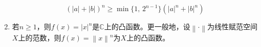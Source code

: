 \documentclass[color=green,thmcnt=section,lang=cn,12pt]{elegantbook}
\numberwithin{equation}{section}%
\numberwithin{figure}{section}%
\newcommand{\CC}{\mathbb{C}}
\begin{document}
\begin{corollary}
\begin{enumerate}
     \begin{equation*}
        (|a|+|b|)^n \geq \min\{1,\,2^{n-1}\}\left(  |a|^{n}+|b|^n \right)
      \end{equation*}
     \item 若$n\geq 1$，则$f(x)=|x|^n$是$\CC$上的凸函数。更一般地，设$\left\lVert \cdot  \right\rVert $为线性赋范空间$X$上的范数，则$f(x)=\left\lVert x  \right\rVert ^n$为$X$上的凸函数。%
  \end{enumerate}
\end{corollary}


\printindex 
\end{document}
